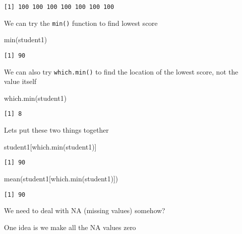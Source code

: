 \documentclass[
  letterpaper,
  DIV=11,
  numbers=noendperiod]{scrartcl}
\newenvironment{Shaded}{\begin{snugshade}}{\end{snugshade}}
\newcommand{\FunctionTok}[1]{\textcolor[rgb]{0.28,0.35,0.67}{#1}}
\newcommand{\NormalTok}[1]{\textcolor[rgb]{0.00,0.23,0.31}{#1}}
\begin{document}
\begin{verbatim}
[1] 100 100 100 100 100 100 100
\end{verbatim}

We can try the \texttt{min()} function to find lowest score

\begin{Shaded}
\begin{Highlighting}[]
\FunctionTok{min}\NormalTok{(student1)}
\end{Highlighting}
\end{Shaded}

\begin{verbatim}
[1] 90
\end{verbatim}

We can also try \texttt{which.min()} to find the location of the lowest
score, not the value itself

\begin{Shaded}
\begin{Highlighting}[]
\FunctionTok{which.min}\NormalTok{(student1)}
\end{Highlighting}
\end{Shaded}

\begin{verbatim}
[1] 8
\end{verbatim}

Lets put these two things together

\begin{Shaded}
\begin{Highlighting}[]
\NormalTok{student1[}\FunctionTok{which.min}\NormalTok{(student1)]}
\end{Highlighting}
\end{Shaded}

\begin{verbatim}
[1] 90
\end{verbatim}

\begin{Shaded}
\begin{Highlighting}[]
\FunctionTok{mean}\NormalTok{(student1[}\FunctionTok{which.min}\NormalTok{(student1)])}
\end{Highlighting}
\end{Shaded}

\begin{verbatim}
[1] 90
\end{verbatim}

We need to deal with NA (missing values) somehow?

One idea is we make all the NA values zero
\end{document}
